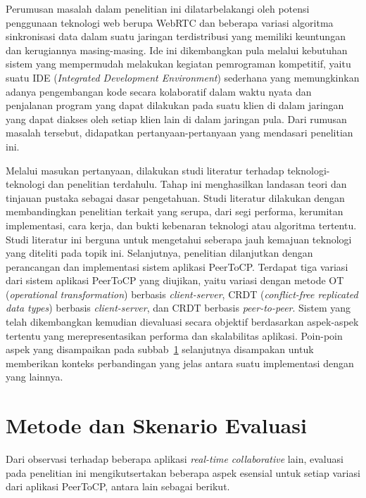 Perumusan masalah dalam penelitian ini dilatarbelakangi oleh potensi penggunaan teknologi web berupa WebRTC dan beberapa variasi algoritma sinkronisasi data dalam suatu jaringan terdistribusi yang memiliki keuntungan dan kerugiannya masing-masing. Ide ini dikembangkan pula melalui kebutuhan sistem yang mempermudah melakukan kegiatan pemrograman kompetitif, yaitu suatu IDE (\textit{Integrated Development Environment}) sederhana yang memungkinkan adanya pengembangan kode secara kolaboratif dalam waktu nyata dan penjalanan program yang dapat dilakukan pada suatu klien di dalam jaringan yang dapat diakses oleh setiap klien lain di dalam jaringan pula. Dari rumusan masalah tersebut, didapatkan pertanyaan-pertanyaan yang mendasari penelitian ini.

Melalui masukan pertanyaan, dilakukan studi literatur terhadap teknologi-teknologi dan penelitian terdahulu. Tahap ini menghasilkan landasan teori dan tinjauan pustaka sebagai dasar pengetahuan. Studi literatur dilakukan dengan membandingkan penelitian terkait yang serupa, dari segi performa, kerumitan implementasi, cara kerja, dan bukti kebenaran teknologi atau algoritma tertentu. Studi literatur ini berguna untuk mengetahui seberapa jauh kemajuan teknologi yang diteliti pada topik ini. Selanjutnya, penelitian dilanjutkan dengan perancangan dan implementasi sistem aplikasi PeerToCP. Terdapat tiga variasi dari sistem aplikasi PeerToCP yang diujikan, yaitu variasi dengan metode OT (\textit{operational transformation}) berbasis \textit{client-server}, CRDT (\textit{conflict-free replicated data types}) berbasis \textit{client-server}, dan CRDT berbasis \textit{peer-to-peer}. Sistem yang telah dikembangkan kemudian dievaluasi secara objektif berdasarkan aspek-aspek tertentu yang merepresentasikan performa dan skalabilitas aplikasi. Poin-poin aspek yang disampaikan pada subbab~\ref{sec:evaluasi} selanjutnya disampakan untuk memberikan konteks perbandingan yang jelas antara suatu implementasi dengan yang lainnya.


\section{Metode dan Skenario Evaluasi}
\label{sec:evaluasi}

Dari observasi terhadap beberapa aplikasi \textit{real-time collaborative} lain, evaluasi pada penelitian ini mengikutsertakan beberapa aspek esensial untuk setiap variasi dari aplikasi PeerToCP, antara lain sebagai berikut.

